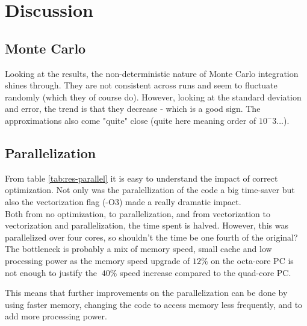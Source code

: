 \documentclass[../main.tex]{subfiles}
\begin{document}
\section{Discussion}
\subsection{Monte Carlo}
Looking at the results, the non-deterministic nature of Monte Carlo integration shines through. They are not consistent across runs and seem to fluctuate randomly (which they of course do). However, looking at the standard deviation and error, the trend is that they decrease - which is a good sign. The approximations also come "quite" close (quite here meaning order of $10^-3$...).

\subsection{Parallelization}
From table \ref{tab:res-parallel} it is easy to understand the impact of correct optimization. Not only was the paralellization of the code a big time-saver but also the vectorization flag (-O3) made a really dramatic impact.\\

Both from no optimization, to parallelization, and from vectorization to vectorization and parallelization, the time spent is halved. However, this was parallelized over four cores, so shouldn't the time be one fourth of the original? The bottleneck is probably a mix of memory speed, small cache and low processing power as the memory speed upgrade of $12\%$ on the octa-core PC is not enough to justify the $~40\%$ speed increase compared to the quad-core PC.

This means that further improvements on the parallelization can be done by using faster memory, changing the code to access memory less frequently, and to add more processing power.
\end{document}
